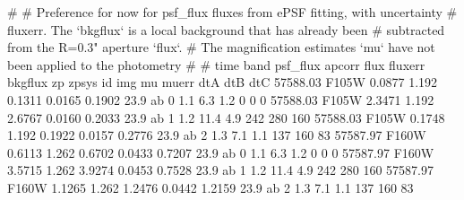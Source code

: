 #
# Preference for now for psf_flux fluxes from ePSF fitting, with uncertainty
# fluxerr.  The `bkgflux` is a local background that has already been 
# subtracted from the R=0.3" aperture `flux`.
# The magnification estimates `mu` have not been applied to the photometry
#
# time   band psf_flux apcorr flux fluxerr bkgflux zp zpsys id img mu muerr dtA dtB dtC
57588.03 F105W 0.0877 1.192 0.1311 0.0165 0.1902 23.9 ab 0 1.1 6.3 1.2 0 0 0
57588.03 F105W 2.3471 1.192 2.6767 0.0160 0.2033 23.9 ab 1 1.2 11.4 4.9 242 280 160
57588.03 F105W 0.1748 1.192 0.1922 0.0157 0.2776 23.9 ab 2 1.3 7.1 1.1 137 160 83
57587.97 F160W 0.6113 1.262 0.6702 0.0433 0.7207 23.9 ab 0 1.1 6.3 1.2 0 0 0
57587.97 F160W 3.5715 1.262 3.9274 0.0453 0.7528 23.9 ab 1 1.2 11.4 4.9 242 280 160
57587.97 F160W 1.1265 1.262 1.2476 0.0442 1.2159 23.9 ab 2 1.3 7.1 1.1 137 160 83
